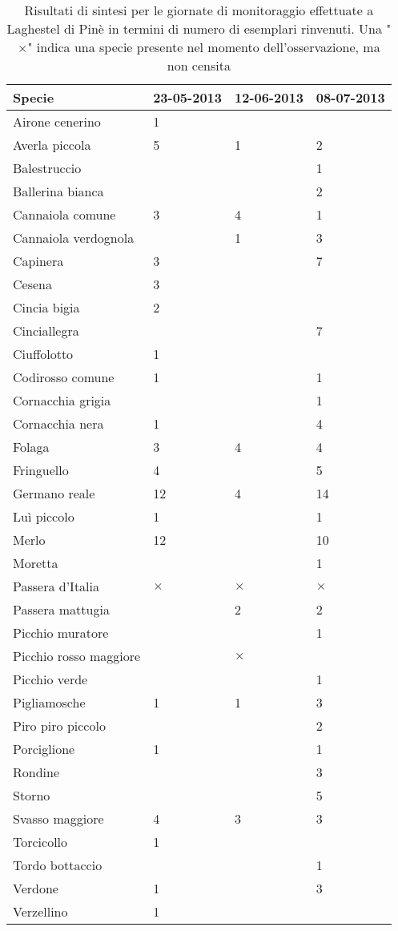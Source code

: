 \documentclass[11pt,a4paper,twoside]{memoir}
\begin{document}
\begin{table}[H]
\centering
\begin{tabular}{llll}
\toprule                
\textbf{  Specie  } & \textbf{  23-05-2013  } & \textbf{  12-06-2013  } & \textbf{  08-07-2013  } \\
\midrule                
  Airone cenerino & 1 &   &   \\
  Averla piccola  & 5 & 1 & 2 \\
  Balestruccio  &   &   & 1 \\
  Ballerina bianca  &   &   & 2 \\
  Cannaiola comune  & 3 & 4 & 1 \\
  Cannaiola verdognola  &   & 1 & 3 \\
  Capinera  & 3 &   & 7 \\
  Cesena  & 3 &   &   \\
  Cincia bigia  & 2 &   &   \\
  Cinciallegra  &   &   & 7 \\
  Ciuffolotto & 1 &   &   \\
  Codirosso comune  & 1 &   & 1 \\
  Cornacchia grigia &   &   & 1 \\
  Cornacchia nera & 1 &   & 4 \\
  Folaga  & 3 & 4 & 4 \\
  Fringuello  & 4 &   & 5 \\
  Germano reale & 12  & 4 & 14  \\
  Luì piccolo & 1 &   & 1 \\
  Merlo & 12  &   & 10  \\
  Moretta &   &   & 1 \\
  Passera d'Italia  & $\times$ & $\times$ & $\times$ \\
  Passera mattugia  &   & 2 & 2 \\
  Picchio muratore  &   &   & 1 \\
  Picchio rosso maggiore  &   & $\times$ &   \\
  Picchio verde &   &   & 1 \\
  Pigliamosche  & 1 & 1 & 3 \\
  Piro piro piccolo &   &   & 2 \\
  Porciglione & 1 &   & 1 \\
  Rondine &   &   & 3 \\
  Storno  &   &   & 5 \\
  Svasso maggiore & 4 & 3 & 3 \\
  Torcicollo  & 1 &   &   \\
  Tordo bottaccio &   &   & 1 \\
  Verdone & 1 &   & 3 \\
  Verzellino  & 1 &   &   \\
\bottomrule               
\end{tabular}
\caption{Risultati di sintesi per le giornate di monitoraggio effettuate a Laghestel di Pinè in termini di numero di esemplari rinvenuti. Una "$\times$" indica una specie presente nel momento dell'osservazione, ma non censita}
\end{table}
\end{document}
